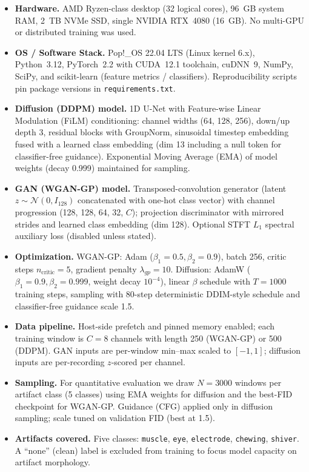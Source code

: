 \documentclass{article}
\begin{document}
\begin{itemize}
    \item \textbf{Hardware.} AMD Ryzen-class desktop (32 logical cores), 96~GB system RAM, 2~TB NVMe SSD, single NVIDIA RTX~4080 (16~GB). No multi-GPU or distributed training was used.
    \item \textbf{OS / Software Stack.} Pop!\_OS 22.04 LTS (Linux kernel 6.x), Python~3.12, PyTorch~2.2 with CUDA~12.1 toolchain, cuDNN~9, NumPy, SciPy, and scikit-learn (feature metrics / classifiers). Reproducibility scripts pin package versions in \texttt{requirements.txt}.
    \item \textbf{Diffusion (DDPM) model.} 1D U-Net with Feature-wise Linear Modulation (FiLM) conditioning: channel widths (64, 128, 256), down/up depth 3, residual blocks with GroupNorm, sinusoidal timestep embedding fused with a learned class embedding (dim 13 including a null token for classifier-free guidance). Exponential Moving Average (EMA) of model weights (decay 0.999) maintained for sampling.
    \item \textbf{GAN (WGAN-GP) model.} Transposed-convolution generator (latent $z \sim \mathcal{N}(0,I_{128})$ concatenated with one-hot class vector) with channel progression (128, 128, 64, 32, $C$); projection discriminator with mirrored strides and learned class embedding (dim 128). Optional STFT $L_1$ spectral auxiliary loss (disabled unless stated).
    \item \textbf{Optimization.} WGAN-GP: Adam ($\beta_1{=}0.5, \beta_2{=}0.9$), batch 256, critic steps $n_\text{critic}{=}5$, gradient penalty $\lambda_{gp}{=}10$. Diffusion: AdamW ($\beta_1{=}0.9, \beta_2{=}0.999$, weight decay $10^{-4}$), linear $\beta$ schedule with $T{=}1000$ training steps, sampling with 80-step deterministic DDIM-style schedule and classifier-free guidance scale 1.5.
    \item \textbf{Data pipeline.} Host-side prefetch and pinned memory enabled; each training window is $C{=}8$ channels with length 250 (WGAN-GP) or 500 (DDPM). GAN inputs are per-window min--max scaled to $[-1,1]$; diffusion inputs are per-recording $z$-scored per channel.
    \item \textbf{Sampling.} For quantitative evaluation we draw $N{=}3000$ windows per artifact class (5 classes) using EMA weights for diffusion and the best-FID checkpoint for WGAN-GP. Guidance (CFG) applied only in diffusion sampling; scale tuned on validation FID (best at 1.5).
    \item \textbf{Artifacts covered.} Five classes: \texttt{muscle}, \texttt{eye}, \texttt{electrode}, \texttt{chewing}, \texttt{shiver}. A ``none'' (clean) label is excluded from training to focus model capacity on artifact morphology.

\end{itemize}
\end{document}
